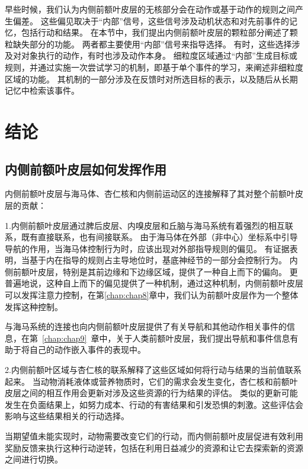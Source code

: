 早些时候，我们认为内侧前额叶皮层的无核部分会在动作或基于动作的规则之间产生偏差。
这些偏见取决于“内部”信号，这些信号涉及动机状态和对先前事件的记忆，包括行动和结果。
在本节中，我们提出内侧前额叶皮层的颗粒部分阐述了颗粒缺失部分的功能。
两者都主要使用“内部”信号来指导选择。
有时，这些选择涉及对对象执行的动作，有时也涉及动作本身。
细粒度区域通过“内部”生成目标或规则，并通过实施一次尝试学习的机制，即基于单个事件的学习，来阐述非细粒度区域的功能。
其机制的一部分涉及在反馈时对所选目标的表示，以及随后从长期记忆中检索该事件。\par



\section{结论}

\subsection{内侧前额叶皮层如何发挥作用}

内侧前额叶皮层与海马体、杏仁核和内侧前运动区的连接解释了其对整个前额叶皮层的贡献：\par

1.内侧前额叶皮层通过脾后皮层、内嗅皮层和丘脑与海马系统有着强烈的相互联系，既有直接联系，也有间接联系。
由于海马体在外部（非中心）坐标系中引导导航的作用，当海马体控制行为时，应该出现对外部指导规则的偏见。
有证据表明，当基于内在指导的规则占主导地位时，基底神经节的一部分会控制行为\cite{packard1996inactivation}。
内侧前额叶皮层，特别是其前边缘和下边缘区域，提供了一种自上而下的偏向。
更普遍地说，这种自上而下的偏见提供了一种机制，通过这种机制，内侧前额叶皮层可以发挥注意力控制，在第\ref{chap:chap8}章中，我们认为前额叶皮层作为一个整体发挥这种控制。\par


与海马系统的连接也向内侧前额叶皮层提供了有关导航和其他动作相关事件的信息，在第~\ref{chap:chap9}~章中，关于人类前额叶皮层，我们提出导航和事件信息有助于将自己的动作嵌入事件的表现中。\par


2.内侧前额叶区域与杏仁核的联系解释了这些区域如何将行动与结果的当前值联系起来。
当动物消耗液体或营养物质时，它们的需求会发生变化，杏仁核和前额叶皮层之间的相互作用会更新对涉及这些资源的行为结果的评估。
类似的更新可能发生在负面结果上，如努力成本、行动的有害结果和引发恐惧的刺激。这些评估会影响与这些结果相关的行动选择。\par


当期望值未能实现时，动物需要改变它们的行动，而内侧前额叶皮层促进有效利用奖励反馈来执行这种行动逆转，包括在利用日益减少的资源和让它去探索新的资源之间进行切换。\par



